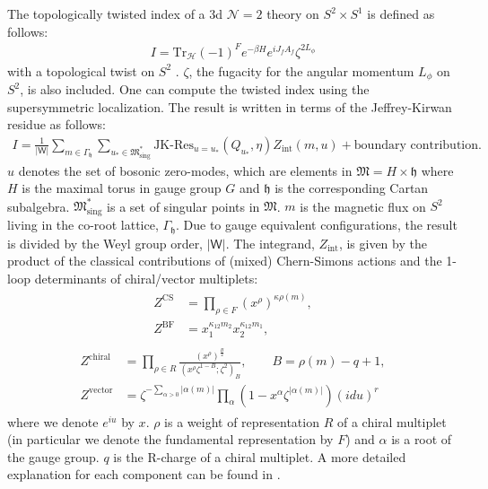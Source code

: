 \documentclass[a4paper,11pt]{article}
\begin{document}
The topologically twisted index of a 3d $\mathcal N = 2$ theory on $S^2 \times S^1$ is defined as follows:
\begin{align}
\label{eq:tind}
I = \mathrm{Tr}_{\mathcal H} (-1)^F e^{-\beta H} e^{i J_f A_f} \zeta^{2 L_\phi}
\end{align}
with a topological twist on $S^2$ \cite{Benini:2015noa}. $\zeta$, the fugacity for the angular momentum $L_\phi$ on $S^2$, is also included. One can compute the twisted index using the supersymmetric localization. The result is written in terms of the Jeffrey-Kirwan residue \cite{1993alg.geom..7001J} as follows:
\begin{align}
I = \frac{1}{|\mathsf W|} \sum_{m \in \Gamma_{\mathfrak h}} \sum_{u_* \in \mathfrak M_\text{sing}^*} \text{JK-Res}_{u = u_*} (Q_{u_*},\eta) Z_\text{int} (m,u)+\text{boundary contribution}.
\end{align}
$u$ denotes the set of bosonic zero-modes, which are elements in $\mathfrak M = H \times \mathfrak h$ where $H$ is the maximal torus in gauge group $G$ and $\mathfrak h$ is the corresponding Cartan subalgebra. $\mathfrak M_\text{sing}^*$ is a set of singular points in $\mathfrak M$. $m$ is the magnetic flux on $S^2$ living in the co-root lattice, $\Gamma_{\mathfrak h}$. Due to gauge equivalent configurations, the result is divided by the Weyl group order, $|\mathsf W|$. The integrand, $Z_\text{int}$, is given by the product of the classical contributions of (mixed) Chern-Simons actions and the 1-loop determinants of chiral/vector multiplets:
\begin{align}
\begin{aligned}
\label{eq:CS}
Z^\text{CS} &= \prod_{\rho \in F} (x^\rho)^{\kappa \rho(m)}, \\
Z^\text{BF} &= x_1^{\kappa_{12} m_2} x_2^{\kappa_{12} m_1},
\end{aligned}
\end{align}
\begin{align}
\begin{aligned}
Z^\text{chiral} &= \prod_{\rho \in R} \frac{\left(x^\rho\right)^{\frac{B}{2}}}{\left(x^\rho \zeta^{1-B};\zeta^2\right)_B}, \qquad B = \rho(m)-q+1, \\
Z^\text{vector} &= \zeta^{-\sum_{\alpha > 0} |\alpha(m)|} \prod_{\alpha} \left(1-x^\alpha \zeta^{|\alpha(m)|}\right) (i du)^r
\end{aligned}
\end{align}
where we denote $e^{i u}$ by $x$. $\rho$ is a weight of representation $R$ of a chiral multiplet (in particular we denote the fundamental representation by $F$) and $\alpha$ is a root of the gauge group. $q$ is the R-charge of a chiral multiplet. A more detailed explanation for each component can be found in \cite{Benini:2015noa}.
\end{document}
